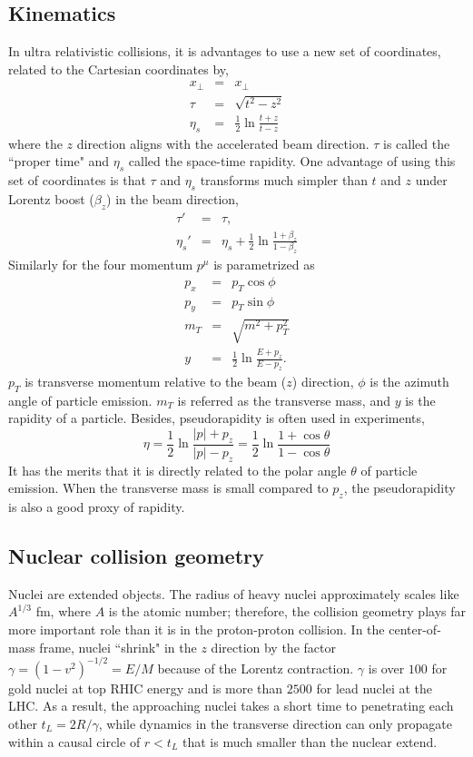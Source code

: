 \subsection{Kinematics}
In ultra relativistic collisions, it is advantages to use a new set of coordinates, related to the Cartesian coordinates by,
\begin{eqnarray}
x_\perp &=& x_\perp\\
\tau &=& \sqrt{t^2 - z^2}\\
\eta_s &=& \frac{1}{2}\ln\frac{t+z}{t-z}
\end{eqnarray}
where the $z$ direction aligns with the accelerated beam direction.
$\tau$ is called the ``proper time" and $\eta_s$ called the space-time rapidity.
One advantage of using this set of coordinates is that $\tau$ and $\eta_s$ transforms much simpler than $t$ and $z$ under Lorentz boost ($\beta_z$) in the beam direction,
\begin{eqnarray}
\tau' &=& \tau,\\
\eta_s' &=& \eta_s + \frac{1}{2}\ln\frac{1+\beta_z}{1-\beta_z}
\end{eqnarray}
Similarly for the four momentum $p^\mu$ is parametrized as 
\begin{eqnarray}
p_x &=& p_T\cos\phi\\
p_y &=& p_T\sin\phi\\
m_T &=& \sqrt{m^2 + p_T^2}\\
y &=& \frac{1}{2}\ln\frac{E+p_z}{E-p_z}.
\end{eqnarray}
$p_T$ is transverse momentum relative to the beam ($z$) direction, $\phi$ is the azimuth angle of particle emission. 
$m_T$ is referred as the transverse mass, and $y$ is the rapidity of a particle.
Besides, pseudorapidity is often used in experiments,
\begin{equation}
\eta = \frac{1}{2}\ln\frac{|p|+p_z}{|p|-p_z} = \frac{1}{2}\ln\frac{1+\cos\theta}{1-\cos\theta}
\end{equation}
It has the merits that it is directly related to the polar angle  $\theta$ of particle emission.
When the transverse mass is small compared to $p_z$, the pseudorapidity is also a good proxy of rapidity.

\subsection{Nuclear collision geometry}
Nuclei are extended objects.
The radius of heavy nuclei approximately scales like $A^{1/3}$ fm, where  $A$ is the atomic number; therefore, the collision geometry plays far more important role than it is in the proton-proton collision.
In the center-of-mass frame,  nuclei ``shrink" in the $z$ direction by the factor $\gamma = (1-v^2)^{-1/2} = E/M$ because of the Lorentz contraction.
$\gamma$ is over $100$ for gold nuclei at top RHIC energy and is more than $2500$ for lead nuclei at the LHC.
As a result, the approaching nuclei takes a short time to penetrating each other $t_L = 2R/\gamma$, while dynamics in the transverse direction can only propagate within a causal circle of $r < t_L$ that is much smaller than the nuclear extend.

